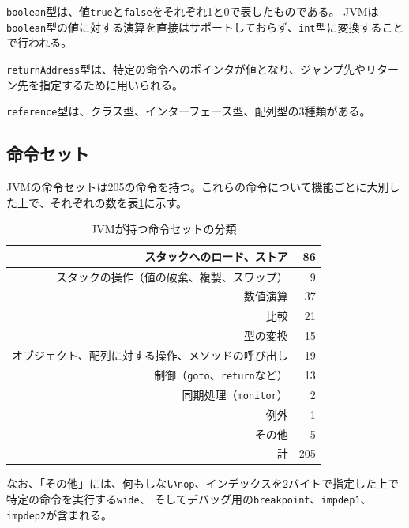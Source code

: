 \verb|boolean|型は、値\verb|true|と\verb|false|をそれぞれ1と0で表したものである。
JVMは\verb|boolean|型の値に対する演算を直接はサポートしておらず、\verb|int|型に変換することで行われる。

\verb|returnAddress|型は、特定の命令へのポインタが値となり、ジャンプ先やリターン先を指定するために用いられる。

\verb|reference|型は、クラス型、インターフェース型、配列型の3種類がある。

\subsection{命令セット}

JVMの命令セットは205の命令を持つ。これらの命令について機能ごとに大別した上で、それぞれの数を表\ref{tb:jvm_opcodes}に示す。

\begin{table}[htbp]
  \caption{JVMが持つ命令セットの分類}
  \label{tb:jvm_opcodes}
  \begin{center}
    \begin{tabular}{|r|r|}
      \hline
      スタックへのロード、ストア & 86 \\ \hline
      スタックの操作（値の破棄、複製、スワップ） & 9 \\ \hline
      数値演算 & 37 \\ \hline
      比較 & 21 \\ \hline
      型の変換 & 15 \\ \hline
      オブジェクト、配列に対する操作、メソッドの呼び出し & 19 \\ \hline
      制御（\verb|goto|、\verb|return|など） & 13 \\ \hline
      同期処理（\verb|monitor|） & 2 \\ \hline
      例外 & 1 \\ \hline
      その他 & 5 \\ \hline
      \hline
      計 & 205 \\ \hline
    \end{tabular}
  \end{center}
\end{table}

なお、「その他」には、何もしない\verb|nop|、インデックスを2バイトで指定した上で特定の命令を実行する\verb|wide|、
そしてデバッグ用の\verb|breakpoint|、\verb|impdep1|、\verb|impdep2|が含まれる。


